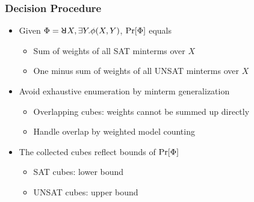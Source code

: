 \begin{frame}
  \frametitle{Decision Procedure}
  \begin{itemize}
    \item Given $\Qf=\random{} X,\exists Y.\pf(X,Y)$, $\Pr[\Phi]$ equals
          \begin{itemize}
            \item Sum of weights of all SAT minterms over $X$
            \item One minus sum of weights of all UNSAT minterms over $X$
          \end{itemize}
          \pause
    \item Avoid exhaustive enumeration by minterm generalization
          \begin{itemize}
            \item Overlapping cubes: weights cannot be summed up directly
            \item Handle overlap by weighted model counting
          \end{itemize}
          \pause
    \item The collected cubes reflect bounds of $\Pr[\Phi]$
          \begin{itemize}
            \item SAT cubes: lower bound
            \item UNSAT cubes: upper bound
          \end{itemize}
  \end{itemize}
\end{frame}


